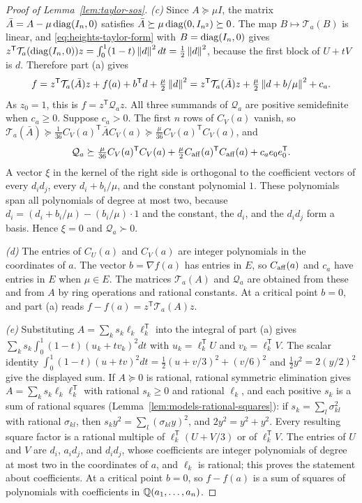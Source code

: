 \begin{proof}[Proof of Lemma~\ref{lem:taylor-sos}]
\emph{(c)} Since $A\succeq\mu I$, the matrix $\bar A=A-\mu\operatorname{diag}(I_n,0)$
satisfies $\bar A\succeq\mu\operatorname{diag}(0,I_{n^2})\succeq0$. The map
$B\mapsto\mathcal T_a(B)$ is linear, and \eqref{eq:heights-taylor-form} with
$B=\operatorname{diag}(I_n,0)$ gives
$z^{\mathsf T}\mathcal T_a(\operatorname{diag}(I_n,0))z=\int_0^1(1-t)\left\lVert d\right\rVert^2dt=\frac12
\left\lVert d\right\rVert^2$, because the first block of $U+tV$ is $d$. Therefore part (a)
gives
\[
 f=z^{\mathsf T}\mathcal T_a(\bar A)z+f(a)+b^{\mathsf T}d
   +\tfrac\mu2\left\lVert d\right\rVert^2
  =z^{\mathsf T}\mathcal T_a(\bar A)z+\tfrac\mu2\left\lVert d+b/\mu\right\rVert^2+c_a.
\]
As $z_0=1$, this is $f=z^{\mathsf T}\mathcal Q_az$. All three summands of
$\mathcal Q_a$ are positive semidefinite when $c_a\ge0$. Suppose $c_a>0$. The
first $n$ rows of $C_V(a)$ vanish, so
$\mathcal T_a(\bar A)\succeq\frac1{36}C_V(a)^{\mathsf T}\bar AC_V(a)
\succeq\frac\mu{36}C_V(a)^{\mathsf T}C_V(a)$, and
\[
 \mathcal Q_a\succeq\tfrac\mu{36}C_V(a)^{\mathsf T}C_V(a)
  +\tfrac\mu2C_{\rm aff}(a)^{\mathsf T}C_{\rm aff}(a)+c_ae_0e_0^{\mathsf T}.
\]
A vector $\xi$ in the kernel of the right side is orthogonal to the
coefficient vectors of every $d_id_j$, every $d_i+b_i/\mu$, and the constant
polynomial $1$. These polynomials span all polynomials of degree at most two,
because $d_i=(d_i+b_i/\mu)-(b_i/\mu)\cdot1$ and the constant, the $d_i$, and
the $d_id_j$ form a basis. Hence $\xi=0$ and $\mathcal Q_a\succ0$.

\emph{(d)} The entries of $C_U(a)$ and $C_V(a)$ are integer polynomials in
the coordinates of $a$. The vector $b=\nabla f(a)$ has entries in $E$, so
$C_{\rm aff}(a)$ and $c_a$ have entries in $E$ when $\mu\in E$. The matrices
$\mathcal T_a(A)$ and $\mathcal Q_a$ are obtained from these and from $A$ by
ring operations and rational constants. At a critical point $b=0$, and part
(a) reads $f-f(a)=z^{\mathsf T}\mathcal T_a(A)z$.

\emph{(e)} Substituting $A=\sum_ks_k\ell_k\ell_k^{\mathsf T}$ into the integral
of part (a) gives
$\sum_ks_k\int_0^1(1-t)(u_k+tv_k)^2dt$ with $u_k=\ell_k^{\mathsf T}U$ and
$v_k=\ell_k^{\mathsf T}V$. The scalar identity
$\int_0^1(1-t)(u+tv)^2dt=\frac12(u+v/3)^2+(v/6)^2$ and
$\frac12y^2=2(y/2)^2$ give the displayed sum. If $A\succeq0$ is rational,
rational symmetric elimination gives
$A=\sum_ks_k\ell_k\ell_k^{\mathsf T}$ with rational $s_k\ge0$ and rational
$\ell_k$, and each positive $s_k$ is a sum of rational squares
(Lemma~\ref{lem:models-rational-squares}): if
$s_k=\sum_l\sigma_{kl}^2$ with rational $\sigma_{kl}$, then
$s_ky^2=\sum_l(\sigma_{kl}y)^2$, and $2y^2=y^2+y^2$. Every resulting square
factor is a rational multiple of $\ell_k^{\mathsf T}(U+V/3)$ or of
$\ell_k^{\mathsf T}V$. The entries of $U$ and $V$ are $d_i$, $a_id_j$, and
$d_id_j$, whose coefficients are integer polynomials of degree at most two in
the coordinates of $a$, and $\ell_k$ is rational; this proves the statement
about coefficients. At a critical point $b=0$, so $f-f(a)$ is a sum of squares
of polynomials with coefficients in $\mathbb Q(a_1,\ldots,a_n)$.
\end{proof}

